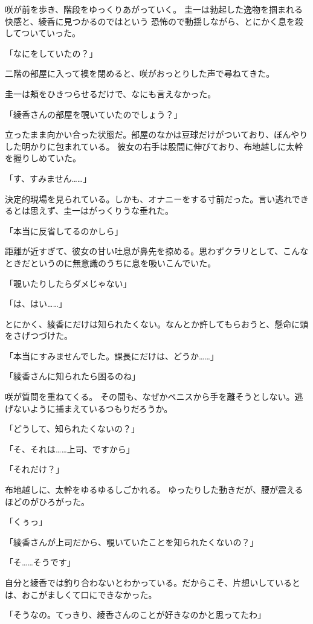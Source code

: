 ﻿\documentclass[
    book,tate,
    line_length=30zw,
    jafontsize=12pt,
    paper=b5j,
    landscape,
    ]{jlreq}
\begin{document}
咲が前を歩き、階段をゆっくりあがっていく。 圭一は勃起した逸物を掴まれる快感と、綾香に見つかるのではという
恐怖ので動揺しながら、とにかく息を殺してついていった。

「なにをしていたの？」

二階の部屋に入って襖を閉めると、咲がおっとりした声で尋ねてきた。

圭一は頬をひきつらせるだけで、なにも言えなかった。

「綾香さんの部屋を覗いていたのでしょう？」

立ったまま向かい合った状態だ。部屋のなかは豆球だけがついており、ぼんやりした明かりに包まれている。
彼女の右手は股間に伸びており、布地越しに太幹を握りしめていた。

「す、すみません……」

決定的現場を見られている。しかも、オナニーをする寸前だった。言い逃れできるとは思えず、圭一はがっくりうな垂れた。

「本当に反省してるのかしら」

距離が近すぎて、彼女の甘い吐息が鼻先を掠める。思わずクラリとして、こんなときだというのに無意識のうちに息を吸いこんでいた。

「覗いたりしたらダメじゃない」

「は、はい……」

とにかく、綾香にだけは知られたくない。なんとか許してもらおうと、懸命に頭をさげつづけた。

「本当にすみませんでした。課長にだけは、どうか……」

「綾香さんに知られたら困るのね」

咲が質問を重ねてくる。 その間も、なぜかペニスから手を離そうとしない。逃げないように捕まえているつもりだろうか。

「どうして、知られたくないの？」

「そ、それは……上司、ですから」

「それだけ？」

布地越しに、太幹をゆるゆるしごかれる。 ゆったりした動きだが、腰が震えるほどのがひろがった。

「くぅっ」

「綾香さんが上司だから、覗いていたことを知られたくないの？」

「そ……そうです」

自分と綾香では釣り合わないとわかっている。だからこそ、片想いしているとは、おこがましくて口にできなかった。

「そうなの。てっきり、綾香さんのことが好きなのかと思ってたわ」
\end{document}
